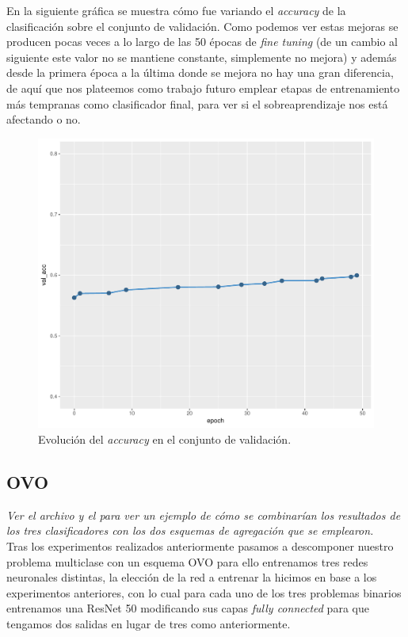 En la siguiente gráfica se muestra cómo fue variando el \textit{accuracy} de la clasificación sobre el conjunto de validación. Como podemos ver estas mejoras se producen pocas veces a lo largo de las 50 épocas de \textit{fine tuning} (de un cambio al siguiente este valor no se mantiene constante, simplemente no mejora) y además desde la primera época a la última donde se mejora no hay una gran diferencia, de aquí que nos plateemos como trabajo futuro emplear etapas de entrenamiento más tempranas como clasificador final, para ver si el sobreaprendizaje nos está afectando o no.

\begin{figure}[H]
  \centering
  \includegraphics[scale=0.5]{img/val_acc.pdf}
  \caption{Evolución del \textit{accuracy} en el conjunto de validación.}
\end{figure}


\subsection{OVO}

\emph{Ver el archivo  y el  para ver un ejemplo de cómo se combinarían los resultados de los tres clasificadores con los dos esquemas de agregación que se emplearon.}\\

Tras los experimentos realizados anteriormente pasamos a descomponer nuestro problema multiclase con un esquema OVO para ello entrenamos tres redes neuronales distintas, la elección de la red a entrenar la hicimos en base a los experimentos anteriores, con lo cual para cada uno de los tres problemas binarios entrenamos una ResNet 50 modificando sus capas \textit{fully connected} para que tengamos dos salidas en lugar de tres como anteriormente.\\

